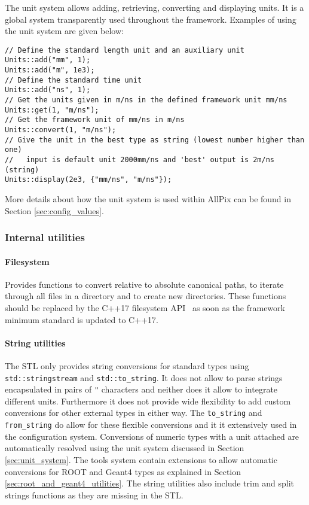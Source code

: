 The unit system allows adding, retrieving, converting and displaying units. It is a global system transparently used throughout the framework. Examples of using the unit system are given below:
\begin{verbatim}
// Define the standard length unit and an auxiliary unit
Units::add("mm", 1); 
Units::add("m", 1e3); 
// Define the standard time unit
Units::add("ns", 1); 
// Get the units given in m/ns in the defined framework unit mm/ns
Units::get(1, "m/ns"); 
// Get the framework unit of mm/ns in m/ns 
Units::convert(1, "m/ns");
// Give the unit in the best type as string (lowest number higher than one)
//   input is default unit 2000mm/ns and 'best' output is 2m/ns (string)
Units::display(2e3, {"mm/ns", "m/ns"}); 
\end{verbatim}

More details about how the unit system is used within AllPix can be found in Section \ref{sec:config_values}.

\subsubsection{Internal utilities}
\paragraph{Filesystem}
\label{sec:filesystem}
Provides functions to convert relative to absolute canonical paths, to iterate through all files in a directory and to create new directories. These functions should be replaced by the C++17 filesystem API~\cite{cppfilesystem} as soon as the framework minimum standard is updated to C++17.

\paragraph{String utilities}
\label{sec:string_utilities}
The STL only provides string conversions for standard types using \texttt{std::stringstream} and \texttt{std::to\_string}. It does not allow to parse strings encapsulated in pairs of \texttt{"} characters and neither does it allow to integrate different units. Furthermore it does not provide wide flexibility to add custom conversions for other external types in either way. The \apsq \texttt{to\_string} and \texttt{from\_string} do allow for these flexible conversions and it it extensively used in the configuration system. Conversions of numeric types with a unit attached are automatically resolved using the unit system discussed in Section \ref{sec:unit_system}. The \apsq tools system contain extensions to allow automatic conversions for ROOT and Geant4 types as explained in Section \ref{sec:root_and_geant4_utilities}. The string utilities also include trim and split strings functions as they are missing in the STL.

